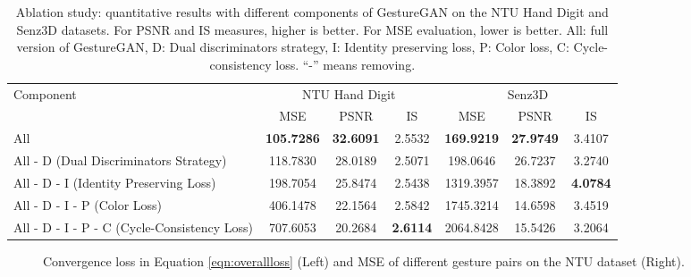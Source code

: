 \documentclass[sigconf]{acmart}
\begin{document}
\begin{table*}[!t] \small
	\centering
	\vspace{-0.2cm}
	\caption{Ablation study: quantitative results with different components of GestureGAN on the NTU Hand Digit and Senz3D datasets. For PSNR and IS measures, higher is better. For MSE evaluation, lower is better.  All: full version of GestureGAN, D: Dual discriminators strategy, I: Identity preserving loss, P: Color loss, C: Cycle-consistency loss. ``-'' means removing.}
	\begin{tabular}{l|c|c|c|c|c|c} \toprule
		\multirow{2}{*}{Component} & \multicolumn{3}{c|}{NTU Hand Digit \cite{liu2016deepfashion}}& \multicolumn{3}{c}{Senz3D \cite{memo2016head}}   \\ \cline{2-7}
		& MSE      & PSNR    & IS                            & MSE       & PSNR    & IS       \\ \midrule	
		All	                                  & \textbf{105.7286}  & \textbf{32.6091} &2.5532      & \textbf{169.9219} & \textbf{27.9749}          & 3.4107 \\ \hline
		All - D (Dual Discriminators Strategy)         & 118.7830 & 28.0189 & 2.5071                        & 198.0646  & 26.7237 & 3.2740 \\ \hline	
		All - D - I (Identity Preserving Loss)           & 198.7054 & 25.8474 & 2.5438                        & 1319.3957 & 18.3892 & \textbf{4.0784} \\ \hline
		All - D - I - P (Color Loss)          & 406.1478 & 22.1564 & 2.5842                        & 1745.3214 & 14.6598 & 3.4519 \\ \hline 
		All - D - I - P - C (Cycle-Consistency Loss)      & 707.6053 & 20.2684 & \textbf{2.6114}               & 2064.8428 & 15.5426 & 3.2064  \\ \hline	
	\end{tabular}
	\label{tab:result}
	\vspace{-0.2cm}
\end{table*}

\begin{figure}[!t] \tiny
	\centering
	\setcounter{subfigure}{0}
	\caption{Convergence loss  in Equation \ref{eqn:overallloss} (Left) and MSE of different gesture pairs on the NTU dataset (Right).}	
	\label{fig:plot_loss_change}
	\vspace{-0.4cm}
\end{figure}
\end{document}
